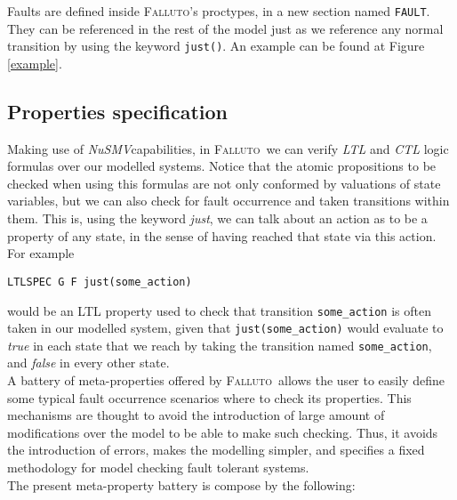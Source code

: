 \documentclass[12pt]{llncs2e/llncs}
\newcommand{\nusmv}{\mbox{\textit{NuSMV}}}
\newcommand{\falluto}{\mbox{\textsc{Falluto}}}
\newcommand{\fallutoSp}{\mbox{\textsc{Falluto~}}}
\begin{document}
Faults are defined inside \falluto's proctypes, in a new section named \texttt{FAULT}. They can be referenced in the rest of the model just as we reference any normal transition by using the keyword \texttt{just()}. An example can be found at Figure \ref{example}.

\subsection{Properties specification}
Making use of \nusmv capabilities, in \fallutoSp we can verify \textit{LTL} and \textit{CTL} logic formulas over our modelled systems. Notice that the atomic propositions to be checked when using this formulas are not only conformed by valuations of state variables, but we can also check for fault occurrence and taken transitions within them. This is, using the keyword \textit{just}, we can talk about an action as to be a property of any state, in the sense of having reached that state via this action. For example
\begin{center}
\texttt{LTLSPEC G F just(some\_action)}
\end{center}
would be an LTL property used to check that transition \texttt{some\_action} is often taken in our modelled system, given that \texttt{just(some\_action)} would evaluate to \textit{true} in each state that we reach by taking the transition named \texttt{some\_action}, and \textit{false} in every other state.\\
A battery of meta-properties offered by \fallutoSp allows the user to easily define some typical fault occurrence scenarios where to check its properties. This mechanisms are thought to avoid the introduction of large amount of modifications over the model to be able to make such checking. Thus, it avoids the introduction of errors, makes the modelling simpler, and specifies a fixed methodology for model checking fault tolerant systems.\\
The present meta-property battery is compose by the following:
\end{document}
